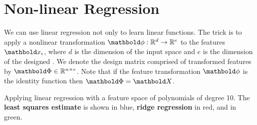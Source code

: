 \section{Non-linear Regression}\label{sec:blr:non_linear}

We can use linear regression not only to learn linear functions.
The trick is to apply a nonlinear transformation $\vphi : \R^d \to \R^e$ to the features $\vx_i$, where $d$ is the dimension of the input space and $e$ is the dimension of the designed .
We denote the design matrix comprised of transformed features by $\mPhi \in \R^{n \times e}$.
Note that if the feature transformation $\vphi$ is the identity function then $\mPhi = \mX$.

\begin{marginfigure}
  \caption{Applying linear regression with a feature space of polynomials of degree 10. The \b{\textbf{least squares estimate}} is shown in blue, \r{\textbf{ridge regression}} in red, and  in green.}
\end{marginfigure}

